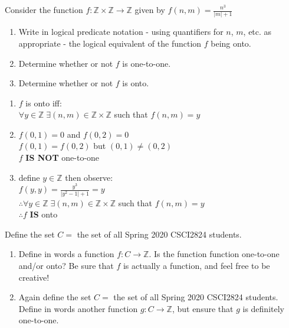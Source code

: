 \documentclass[11pt]{amsart}
\newcommand{\be}{\begin{enumerate}}
\newcommand{\ee}{\end{enumerate}}
\begin{document}
\item Consider the function $f: \mathbb{Z} \times \mathbb{Z} \rightarrow \mathbb{Z}$ given by $f(n,m)=\frac{n^3}{|m|+1}$
	\be
		\item Write in logical predicate notation - using quantifiers for $n$, $m$, etc. as appropriate - the logical equivalent of the function $f$ being onto.
		\item Determine whether or not $f$ is one-to-one.
		\item Determine whether or not $f$ is onto.
	\ee
	\begin{sol}
		\be
			\item $f$ is onto iff:\\
			$\forall y \in \mathbb{Z} \; \exists (n,m) \in \mathbb{Z} \times \mathbb{Z}$ such that $f(n,m) = y$
			\item $f(0,1) = 0$ and $f(0,2) = 0$\\
			$f(0,1) = f(0,2)$ but $(0,1) \ne (0,2)$\\
			$f$ \textbf{IS NOT} one-to-one
			\item define $y \in \mathbb{Z}$ then observe:\\
			$f(y,y) = \frac{y^3}{|y^2 - 1| + 1} = y$\\
			$\therefore \forall y \in \mathbb{Z} \; \exists (n,m) \in \mathbb{Z} \times \mathbb{Z}$ such that $f(n,m) = y$\\
			$\therefore f$ \textbf{IS} onto
		\ee
	\end{sol}

\item Define the set $C=$ the set of all Spring 2020 CSCI2824 students.
\be
	\item Define in words a function $f: C \rightarrow \mathbb{Z}$.  Is the function function one-to-one and/or onto? Be sure that $f$ is actually a function, and feel free to be creative!
	\item Again define the set $C=$ the set of all Spring 2020 CSCI2824 students.  Define in words another function $g: C \rightarrow \mathbb{Z}$, but ensure that $g$ is definitely one-to-one. 
\ee
\end{document}
